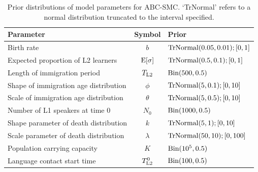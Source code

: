 \begin{table}
\caption{Prior distributions of model parameters for ABC-SMC. `TrNormal' refers to a normal distribution truncated to the interval specified.}\label{tbl:optimizebounds}
\begin{tabular}{lcl}
\toprule
Parameter & Symbol & Prior\\
\midrule
Birth rate & $b$ & $\textnormal{TrNormal} (0.05, 0.01); [0, 1]$\\
Expected proportion of L2 learners & $\textnormal{E}[\sigma]$ & $\textnormal{TrNormal} (0.5, 0.1); [0, 1]$\\
Length of immigration period & $T_\textnormal{L2}$ & $\textnormal{Bin} (500, 0.5)$\\
Shape of immigration age distribution & $\phi$ & $\textnormal{TrNormal} (5, 0.1); [0, 10]$\\
Scale of immigration age distribution & $\theta$ & $\textnormal{TrNormal} (5, 0.5); [0, 10]$\\
Number of L1 speakers at time 0 & $N_0$ & $\textnormal{Bin} (1000, 0.5)$\\
Shape parameter of death distribution & $k$ & $\textnormal{TrNormal} (5, 1); [0, 10]$\\
Scale parameter of death distribution & $\lambda$ & $\textnormal{TrNormal} (50, 10); [0, 100]$\\
Population carrying capacity & $K$ & $\textnormal{Bin} (10^5, 0.5)$\\
Language contact start time & $T_\textnormal{L2}^0$ & $\textnormal{Bin} (100, 0.5)$\\
\bottomrule
\end{tabular}
\end{table}
